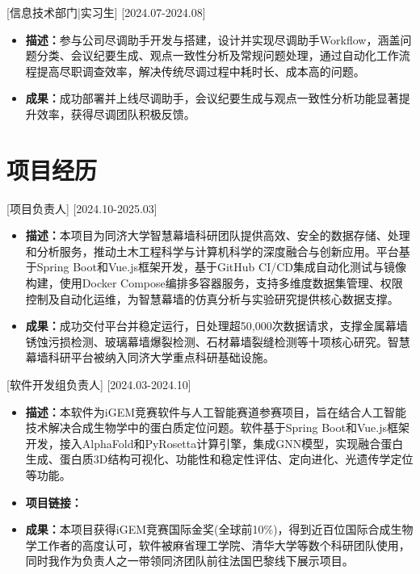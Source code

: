 \documentclass{style/template}
\begin{document}
[\textnormal{信息技术部门|}实习生]
[2024.07-2024.08]
\begin{itemize}
    \item \textbf{描述：}参与公司尽调助手开发与搭建，设计并实现尽调助手Workflow，涵盖问题分类、会议纪要生成、观点一致性分析及常规问题处理，通过自动化工作流程提高尽职调查效率，解决传统尽调过程中耗时长、成本高的问题。
    \item \textbf{成果：}成功部署并上线尽调助手，会议纪要生成与观点一致性分析功能显著提升效率，获得尽调团队积极反馈。
\end{itemize}

\section{项目经历}

[项目负责人]
[2024.10-2025.03]
\begin{itemize}
    \item \textbf{描述：}本项目为同济大学智慧幕墙科研团队提供高效、安全的数据存储、处理和分析服务，推动土木工程科学与计算机科学的深度融合与创新应用。平台基于Spring Boot和Vue.js框架开发，基于GitHub CI/CD集成自动化测试与镜像构建，使用Docker Compose编排多容器服务，支持多维度数据集管理、权限控制及自动化运维，为智慧幕墙的仿真分析与实验研究提供核心数据支撑。
    \item \textbf{成果：}成功交付平台并稳定运行，日处理超50,000次数据请求，支撑金属幕墙锈蚀污损检测、玻璃幕墙爆裂检测、石材幕墙裂缝检测等十项核心研究。智慧幕墙科研平台被纳入同济大学重点科研基础设施。
\end{itemize}

[软件开发组负责人]
[2024.03-2024.10]
\begin{itemize}
    \item \textbf{描述：}本软件为iGEM竞赛软件与人工智能赛道参赛项目，旨在结合人工智能技术解决合成生物学中的蛋白质定位问题。软件基于Spring Boot和Vue.js框架开发，接入AlphaFold和PyRosetta计算引擎，集成GNN模型，实现融合蛋白生成、蛋白质3D结构可视化、功能性和稳定性评估、定向进化、光遗传学定位等功能。
    \item \textbf{项目链接：}
    \item \textbf{成果：}本项目获得iGEM竞赛国际金奖(全球前10\%)，得到近百位国际合成生物学工作者的高度认可，软件被麻省理工学院、清华大学等数个科研团队使用，同时我作为负责人之一带领同济团队前往法国巴黎线下展示项目。
\end{itemize}
\end{document}
